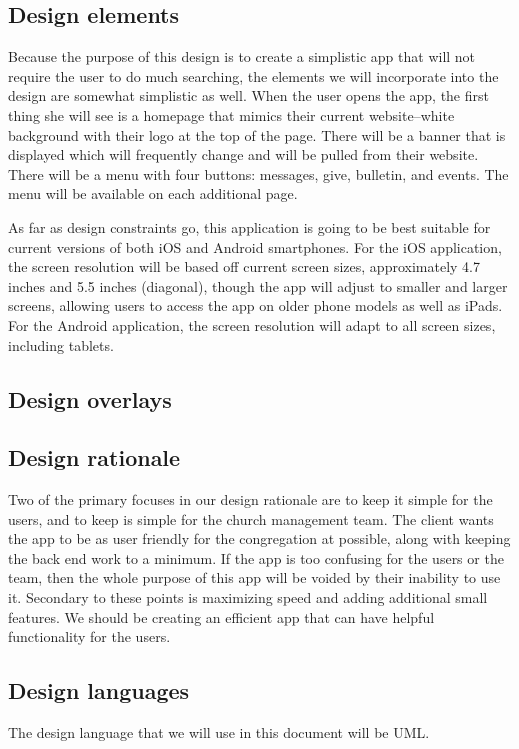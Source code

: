 \documentclass[letterpaper,10pt,draftclsnofoot,onecolumn,titlepage]{IEEEtran}
\begin{document}
		\subsection{Design elements}
			Because the purpose of this design is to create a simplistic app that will not require the user to do much searching, the elements we will incorporate into the design are somewhat simplistic as well. 
			When the user opens the app, the first thing she will see is a homepage that mimics their current website--white background with their logo at the top of the page. 
			There will be a banner that is displayed which will frequently change and will be pulled from their website. 
			There will be a menu with four buttons: messages, give, bulletin, and events. 
			The menu will be available on each additional page. 
			
			As far as design constraints go, this application is going to be best suitable for current versions of both iOS and Android smartphones. 
			For the iOS application, the screen resolution will be based off current screen sizes, approximately 4.7 inches and 5.5 inches (diagonal), though the app will adjust to smaller and larger screens, allowing users to access the app on older phone models as well as iPads. 
			For the Android application, the screen resolution will adapt to all screen sizes, including tablets. 
		
		\subsection{Design overlays}

		\subsection{Design rationale}
		Two of the primary focuses in our design rationale are to keep it simple for the users, and to keep is simple for the church management team.
		The client wants the app to be as user friendly for the congregation at possible, along with keeping the back end work to a minimum.
		If the app is too confusing for the users or the team, then the whole purpose of this app will be voided by their inability to use it.
		Secondary to these points is maximizing speed and adding additional small features.
		We should be creating an efficient app that can have helpful functionality for the users.

		\subsection{Design languages}
		The design language that we will use in this document will be UML.
\end{document}
